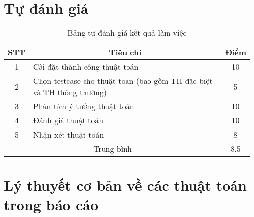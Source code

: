 \documentclass[a4paper, 12pt]{article}
\begin{document}
    \section{Tự đánh giá}
    \begin{table}[H]
        \begin{tabular}{|c|l|c|}
        \hline
        STT & \multicolumn{1}{c|}{Tiêu chí}                                         & Điểm \\ \hline
        1   & Cài đặt thành công thuật toán                                         & 10   \\ \hline
        2   & Chọn testcase cho thuật toán (bao gồm TH đặc biệt và TH thông thường) & 5    \\ \hline
        3   & Phân tích ý tưởng thuật toán                                          & 10   \\ \hline
        4   & Đánh giá thuật toán                                                   & 10   \\ \hline
        5   & Nhận xét thuật toán                                                   & 8    \\ \hline
        \multicolumn{2}{|c|}{Trung bình}                                            & 8.5  \\ \hline
        \end{tabular}
        \caption{Bảng tự đánh giá kết quả làm việc}
    \end{table}
    \clearpage

    \section{Lý thuyết cơ bản về các thuật toán trong báo cáo}
\end{document}
